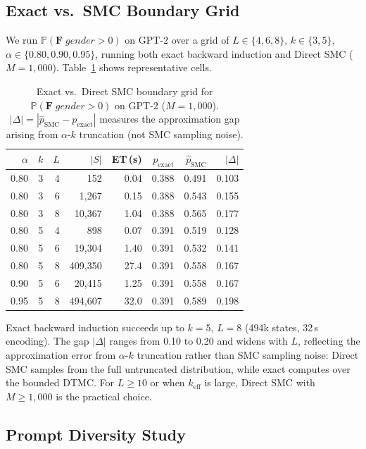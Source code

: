 \documentclass{article}
\newcommand{\Prob}{\mathbb{P}}
\begin{document}
\subsection{Exact vs.\ SMC Boundary Grid}
\label{sec:grid}

We run $\Prob(\mathbf{F}\;\textit{gender}{>}0)$ on GPT-2 over a grid of
$L \in \{4, 6, 8\}$, $k \in \{3, 5\}$, $\alpha \in \{0.80, 0.90, 0.95\}$,
running both exact backward induction and Direct SMC ($M{=}1{,}000$).
Table~\ref{tab:grid} shows representative cells.

\begin{table}[tb]
\centering
\small
\caption{Exact vs.\ Direct SMC boundary grid for
$\Prob(\mathbf{F}\;\textit{gender}{>}0)$ on GPT-2 ($M{=}1{,}000$).
$|\Delta| = |\hat{p}_\text{SMC} - p_\text{exact}|$ measures the approximation
gap arising from $\alpha$-$k$ truncation (not SMC sampling noise).}
\label{tab:grid}
\begin{tabular}{rrr r r rr r}
\toprule
$\alpha$ & $k$ & $L$ & $|S|$ & ET\,(s) & $p_\text{exact}$ & $\hat{p}_\text{SMC}$ & $|\Delta|$ \\
\midrule
0.80 & 3 & 4 &       152 & 0.04 & 0.388 & 0.491 & 0.103 \\
0.80 & 3 & 6 &     1,267 & 0.15 & 0.388 & 0.543 & 0.155 \\
0.80 & 3 & 8 &    10,367 & 1.04 & 0.388 & 0.565 & 0.177 \\
0.80 & 5 & 4 &       898 & 0.07 & 0.391 & 0.519 & 0.128 \\
0.80 & 5 & 6 &    19,304 & 1.40 & 0.391 & 0.532 & 0.141 \\
0.80 & 5 & 8 &   409,350 & 27.4 & 0.391 & 0.558 & 0.167 \\
0.90 & 5 & 6 &    20,415 & 1.25 & 0.391 & 0.558 & 0.167 \\
0.95 & 5 & 8 &   494,607 & 32.0 & 0.391 & 0.589 & 0.198 \\
\bottomrule
\end{tabular}
\end{table}

Exact backward induction succeeds up to $k{=}5$, $L{=}8$ (494k states, 32\,s
encoding).
The gap $|\Delta|$ ranges from 0.10 to 0.20 and widens with $L$, reflecting
the approximation error from $\alpha$-$k$ truncation rather than SMC sampling
noise: Direct SMC samples from the full untruncated distribution, while exact
computes over the bounded DTMC.
For $L\ge10$ or when $k_\text{eff}$ is large, Direct SMC with $M{\ge}1{,}000$
is the practical choice.

\subsection{Prompt Diversity Study}
\label{sec:prompt-diversity}
\end{document}
